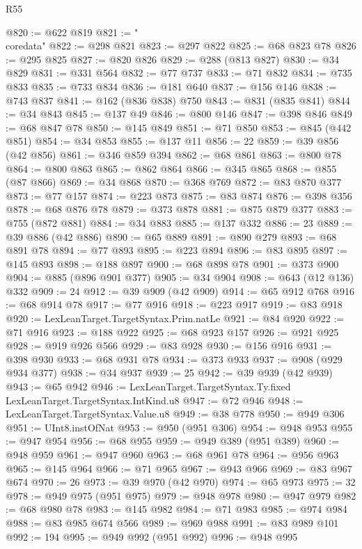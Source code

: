\begin{lexlean}{R55}
\begin{coremodule}
{{@820 := @622 @819
@821 := "\\coredata"
@822 := @298 @821
@823 := @297 @822
@825 := @68 @823 @78
@826 := @295 @825
@827 := @820 @826
@829 := @288 (@813 @827)
@830 := @34 @829
@831 := @331 @564
@832 := @77 @737
@833 := @71 @832
@834 := @735 @833
@835 := @733 @834
@836 := @181 @640
@837 := @156 @146
@838 := @743 @837
@841 := @162 (@836 @838) @750
@843 := @831 (@835 @841)
@844 := @34 @843
@845 := @137 @49
@846 := @800 @146
@847 := @398 @846
@849 := @68 @847 @78
@850 := @145 @849
@851 := @71 @850
@853 := @845 (@442 @851)
@854 := @34 @853
@855 := @137 @11
@856 := 22
@859 := @39 @856 (@42 @856)
@861 := @346 @859 @394
@862 := @68 @861
@863 := @800 @78
@864 := @800 @863
@865 := @862 @864
@866 := @345 @865
@868 := @855 (@87 @866)
@869 := @34 @868
@870 := @368 @769
@872 := @83 @870 @377
@873 := @77 @157
@874 := @223 @873
@875 := @83 @874
@876 := @398 @356
@878 := @68 @876 @78
@879 := @373 @878
@881 := @875 @879 @377
@883 := @755 (@872 @881)
@884 := @34 @883
@885 := @137 @332
@886 := 23
@889 := @39 @886 (@42 @886)
@890 := @65 @889
@891 := @890 @279
@893 := @68 @891 @78
@894 := @77 @893
@895 := @223 @894
@896 := @83 @895
@897 := @145 @893
@898 := @188 @897
@900 := @68 @898 @78
@901 := @373 @900
@904 := @885 (@896 @901 @377)
@905 := @34 @904
@908 := @643 (@12 @136) @332
@909 := 24
@912 := @39 @909 (@42 @909)
@914 := @65 @912 @768
@916 := @68 @914 @78
@917 := @77 @916
@918 := @223 @917
@919 := @83 @918
@920 := LexLeanTarget.TargetSyntax.Prim.natLe
@921 := @84 @920
@922 := @71 @916
@923 := @188 @922
@925 := @68 @923 @157
@926 := @921 @925
@928 := @919 @926 @566
@929 := @83 @928
@930 := @156 @916
@931 := @398 @930
@933 := @68 @931 @78
@934 := @373 @933
@937 := @908 (@929 @934 @377)
@938 := @34 @937
@939 := 25
@942 := @39 @939 (@42 @939)
@943 := @65 @942
@946 := LexLeanTarget.TargetSyntax.Ty.fixed LexLeanTarget.TargetSyntax.IntKind.u8
@947 := @72 @946
@948 := LexLeanTarget.TargetSyntax.Value.u8
@949 := @38 @778
@950 := @949 @306
@951 := UInt8.instOfNat
@953 := @950 (@951 @306)
@954 := @948 @953
@955 := @947 @954
@956 := @68 @955
@959 := @949 @389 (@951 @389)
@960 := @948 @959
@961 := @947 @960
@963 := @68 @961 @78
@964 := @956 @963
@965 := @145 @964
@966 := @71 @965
@967 := @943 @966
@969 := @83 @967 @674
@970 := 26
@973 := @39 @970 (@42 @970)
@974 := @65 @973
@975 := 32
@978 := @949 @975 (@951 @975)
@979 := @948 @978
@980 := @947 @979
@982 := @68 @980 @78
@983 := @145 @982
@984 := @71 @983
@985 := @974 @984
@988 := @83 @985 @674 @566
@989 := @969 @988
@991 := @83 @989 @101
@992 := 194
@995 := @949 @992 (@951 @992)
@996 := @948 @995
}}
\end{coremodule}
\end{lexlean}
